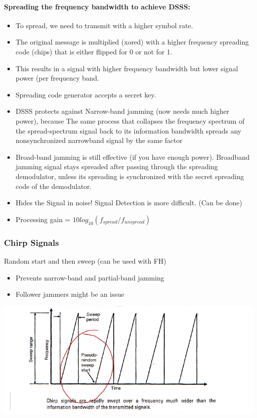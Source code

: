 \paragraph{Spreading the frequency bandwidth to achieve DSSS:}
\begin{itemize}
    \item To spread, we need to transmit with a higher symbol rate.
    \item The original message is multiplied (xored) with a higher frequency spreading code (chips) that is either flipped for 0 or not for 1.
    \item This results in a signal with higher frequency bandwidth but lower signal power (per frequency band.
    \item Spreading code generator accepts a secret key.
    \item DSSS protects against Narrow-band jamming (now needs much higher power), because The same process that collapses the frequency spectrum of the spread-spectrum signal back to its information bandwidth spreads any nonsynchronized narrowband signal by the same factor
    \item Broad-band jamming is still effective (if you have enough power). Broadband jamming signal stays spreaded after passing through the spreading demodulator, unless its spreading is synchronized with the secret spreading code of the demodulator.
    \item Hides the Signal in noise! Signal Detection is more difficult. (Can be done)
    \item Processing gain = $10 log_{10}(f_{spread} / f_{unspread})$
\end{itemize}

\subsubsection{Chirp Signals} 
Random start and then sweep (can be used with FH)
\begin{itemize}
    \item Prevents narrow-band and partial-band jamming
    \item Follower jammers might be an issue
\end{itemize}

\begin{minipage}{\linewidth}
    \centering      
    \includegraphics[width=\linewidth]{Figures/L2_chirp_signals.PNG} 
\end{minipage}

